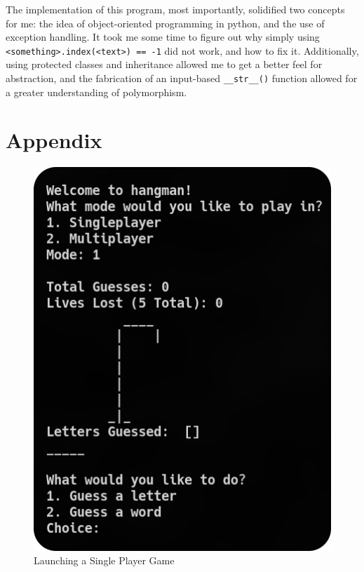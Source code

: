 \documentclass[
	letterpaper, %
	10pt, %
]{CSUniSchoolLabReport}
\begin{document}
The implementation of this program, most importantly, solidified two concepts for me: the idea of object-oriented programming in python, and the use of exception handling. It took me some time to figure out why simply using \texttt{<something>.index(<text>) == -1} did not work, and how to fix it. Additionally, using protected classes and inheritance allowed me to get a better feel for abstraction, and the fabrication of an input-based \texttt{\_\_str\_\_()} function allowed for a greater understanding of polymorphism.

\section{Appendix}



  \begin{figure}[H]
    \centering
    \includegraphics[width=.6\textwidth]{Figures/singleplayer.png}
    \caption{Launching a Single Player Game}
    \label{fig:1}
  \end{figure}
\end{document}
